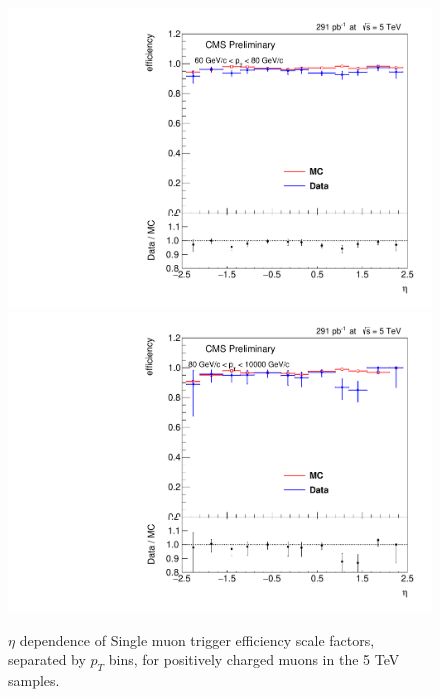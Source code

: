 \begin{figure}
\includegraphics[width=0.45\linewidth]{plots/efficiency/5_zmmhlt_positive/PtBins_eta_pt10.pdf}
\includegraphics[width=0.45\linewidth]{plots/efficiency/5_zmmhlt_positive/PtBins_eta_pt11.pdf}
\caption{$\eta$ dependence of Single muon trigger efficiency scale factors, separated by $p_T$ bins, for positively charged muons in the 5 TeV samples.}
\label{fig:Eff:mu:5:HLT:pos}
\end{figure}

